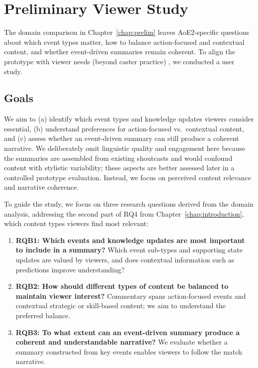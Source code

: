 \chapter{Preliminary Viewer Study}\label{chap:viewer-study}
The domain comparison in Chapter~\ref{chap:prelim} leaves AoE2-specific questions about which event types matter, how to balance action-focused and contextual content, and whether event-driven summaries remain coherent. To align the prototype with viewer needs (beyond caster practice) \cite{penney2021}, we conducted a user study.

\section{Goals}

We aim to (a) identify which event types and knowledge updates viewers consider essential, (b) understand preferences for action-focused vs.\ contextual content, and (c) assess whether an event-driven summary can still produce a coherent narrative. We deliberately omit linguistic quality and engagement here because the summaries are assembled from existing shoutcasts and would confound content with stylistic variability; these aspects are better assessed later in a controlled prototype evaluation. Instead, we focus on perceived content relevance and narrative coherence.

To guide the study, we focus on three research questions derived from the domain analysis, addressing the second part of RQ4 from Chapter~\ref{chap:introduction}, which content types viewers find most relevant:
\begin{enumerate}[noitemsep, topsep=0pt]
  \item \textbf{RQB1: Which events and knowledge updates are most important to include in a summary?} Which event sub-types and supporting state updates are valued by viewers, and does contextual information such as predictions improve understanding?
  \item \textbf{RQB2: How should different types of content be balanced to maintain viewer interest?} Commentary spans action-focused events and contextual strategic or skill-based content; we aim to understand the preferred balance.
  \item \textbf{RQB3: To what extent can an event-driven summary produce a coherent and understandable narrative?} We evaluate whether a summary constructed from key events enables viewers to follow the match narrative.
\end{enumerate}

